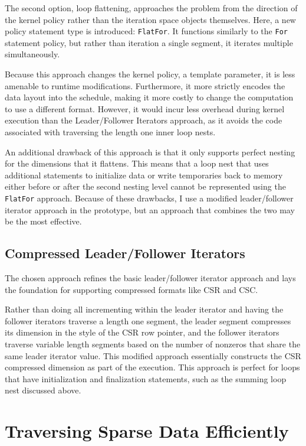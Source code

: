 The second option, loop flattening, approaches the problem from the direction of the kernel policy rather than the iteration space objects themselves.
Here, a new policy statement type is introduced: \verb.FlatFor.. 
It functions similarly to the \verb.For. statement policy, but rather than iteration a single segment, it iterates multiple simultaneously. 

Because this approach changes the kernel policy, a template parameter, it is less amenable to runtime modifications. 
Furthermore, it more strictly encodes the data layout into the schedule, making it more costly to change the computation to use a different format.
However, it would incur less overhead during kernel execution than the Leader/Follower Iterators approach, as it avoids the code associated with traversing the length one inner loop nests.

An additional drawback of this approach is that it only supports perfect nesting for the dimensions that it flattens. 
This means that a loop nest that uses additional statements to initialize data or write temporaries back to memory either before or after the second nesting level cannot be represented using the \verb.FlatFor. approach.
Because of these drawbacks, I use a modified leader/follower iterator approach in the prototype, but an approach that combines the two may be the most effective.

\subsection{Compressed Leader/Follower Iterators}

The chosen approach refines the basic leader/follower iterator approach and lays the foundation for supporting compressed formats like CSR and CSC.

Rather than doing all incrementing within the leader iterator and having the follower iterators traverse a length one segment, the leader segment compresses its dimension in the style of the CSR row pointer, and the follower iterators traverse variable length segments based on the number of nonzeros that share the same leader iterator value.
This modified approach essentially constructs the CSR compressed dimension as part of the execution.
This approach is perfect for loops that have initialization and finalization statements, such as the summing loop nest discussed above. 


\section{Traversing Sparse Data Efficiently}\label{sec:SparseAccess}

